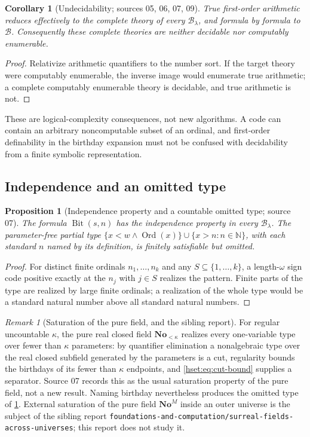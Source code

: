 \documentclass[11pt,letterpaper]{article}
\newtheorem{proposition}[proposition]{Proposition}\aliascntresetthe{proposition}
\newtheorem{corollary}[corollary]{Corollary}\aliascntresetthe{corollary}
\theoremstyle{definition}
\theoremstyle{remark}
\newtheorem{remark}[remark]{Remark}\aliascntresetthe{remark}
\newcommand{\No}{\mathbf{No}}
\newcommand{\Ord}{\operatorname{Ord}}
\newcommand{\B}{\mathcal B}
\newcommand{\Bit}{\operatorname{Bit}}
\newcommand{\repo}[1]{\nolinkurl{#1}}
\begin{document}
\begin{corollary}[Undecidability; sources 05, 06, 07, 09]\label{hset:cor:undecidable}
True first-order arithmetic reduces effectively to the complete theory of
every $\B_\lambda$, and formula by formula to $\B$. Consequently these complete
theories are neither decidable nor computably enumerable.
\end{corollary}
\begin{proof}
Relativize arithmetic quantifiers to the number sort. If the target theory were
computably enumerable, the inverse image would enumerate true arithmetic; a
complete computably enumerable theory is decidable, and true arithmetic is not.
\end{proof}

These are logical-complexity consequences, not new algorithms. A code can
contain an arbitrary noncomputable subset of an ordinal, and first-order
definability in the birthday expansion must not be confused with decidability
from a finite symbolic representation.

\subsection{Independence and an omitted type}

\begin{proposition}[Independence property and a countable omitted type; source 07]
\label{hset:prop:ip}
The formula $\Bit(s,n)$ has the independence property in every $\B_\lambda$.
The parameter-free partial type
$\{x<w\land\Ord(x)\}\cup\{x>n:n\in\mathbb N\}$, with each standard $n$ named by
its definition, is finitely satisfiable but omitted.
\end{proposition}
\begin{proof}
For distinct finite ordinals $n_1,\dots,n_k$ and any
$S\subseteq\{1,\dots,k\}$, a length-$\omega$ sign code positive exactly at the
$n_j$ with $j\in S$ realizes the pattern. Finite parts of the type are realized
by large finite ordinals; a realization of the whole type would be a standard
natural number above all standard natural numbers.
\end{proof}

\begin{remark}[Saturation of the pure field, and the sibling report]
\label{hset:rem:saturation}
For regular uncountable $\kappa$, the pure real closed field
$\No_{<\kappa}$ realizes every one-variable type over fewer than $\kappa$
parameters: by quantifier elimination a nonalgebraic type over the real closed
subfield generated by the parameters is a cut, regularity bounds the birthdays
of its fewer than $\kappa$ endpoints, and \eqref{hset:eq:cut-bound} supplies a
separator. Source 07 records this as the usual saturation property of the pure
field, not a new result. Naming birthday nevertheless produces the omitted type
of \cref{hset:prop:ip}. External saturation of the pure field $\No^M$ inside an
outer universe is the subject of the sibling report
\repo{foundations-and-computation/surreal-fields-across-universes}; this report
does not study it.
\end{remark}
\end{document}

